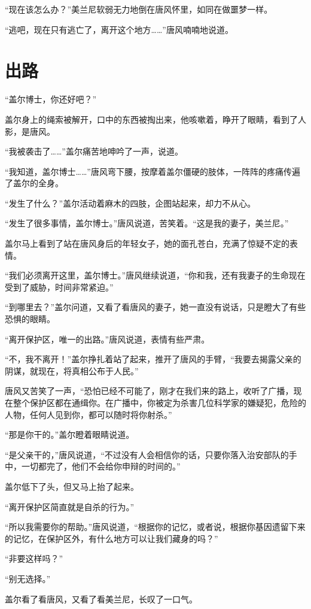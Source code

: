 “现在该怎么办？”美兰尼软弱无力地倒在唐风怀里，如同在做噩梦一样。

“逃吧，现在只有逃亡了，离开这个地方……”唐风喃喃地说道。

\chapter{出路}

“盖尔博士，你还好吧？”

盖尔身上的绳索被解开，口中的东西被掏出来，他咳嗽着，睁开了眼睛，看到了人影，是唐风。

“我被袭击了……”盖尔痛苦地呻吟了一声，说道。

“我知道，盖尔博士……”唐风弯下腰，按摩着盖尔僵硬的肢体，一阵阵的疼痛传遍了盖尔的全身。

“发生了什么？”盖尔活动着麻木的四肢，企图站起来，却力不从心。

“发生了很多事情，盖尔博士。”唐风说道，苦笑着。“这是我的妻子，美兰尼。”

盖尔马上看到了站在唐风身后的年轻女子，她的面孔苍白，充满了惊疑不定的表情。

“我们必须离开这里，盖尔博士。”唐风继续说道，“你和我，还有我妻子的生命现在受到了威胁，时间非常紧迫。”

“到哪里去？”盖尔问道，又看了看唐风的妻子，她一直没有说话，只是瞪大了有些恐惧的眼睛。

“离开保护区，唯一的出路。”唐风说道，表情有些严肃。

“不，我不离开！”盖尔挣扎着站了起来，推开了唐风的手臂，“我要去揭露父亲的阴谋，就现在，将真相公布于人民。”

唐风又苦笑了一声，“恐怕已经不可能了，刚才在我们来的路上，收听了广播，现在整个保护区都在通缉你。在广播中，你被定为杀害几位科学家的嫌疑犯，危险的人物，任何人见到你，都可以随时将你射杀。”

“那是你干的。”盖尔瞪着眼睛说道。

“是父亲干的，”唐风说道，“不过没有人会相信你的话，只要你落入治安部队的手中，一切都完了，他们不会给你申辩的时间的。”

盖尔低下了头，但又马上抬了起来。

“离开保护区简直就是自杀的行为。”

“所以我需要你的帮助。”唐风说道，“根据你的记忆，或者说，根据你基因遗留下来的记忆，在保护区外，有什么地方可以让我们藏身的吗？”

“非要这样吗？”

“别无选择。”

盖尔看了看唐风，又看了看美兰尼，长叹了一口气。

